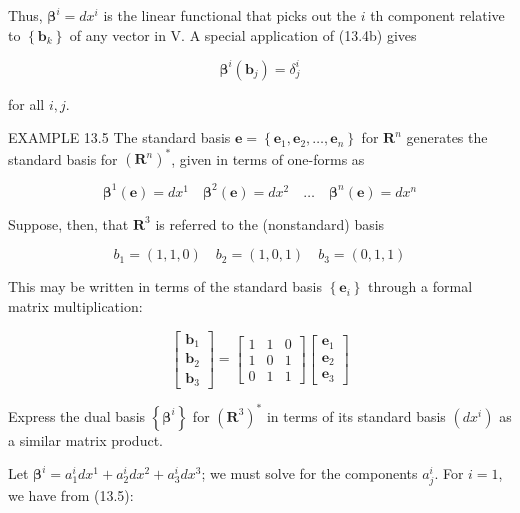 \documentclass[10pt]{article}
\begin{document}
Thus, $\boldsymbol{\beta}^{i}=d x^{i}$ is the linear functional that picks out the $i$ th component relative to $\left\{\mathbf{b}_{k}\right\}$ of any vector in V. A special application of (13.4b) gives


\begin{equation*}
\boldsymbol{\beta}^{i}\left(\mathbf{b}_{j}\right)=\delta_{j}^{i} \tag{13.5}
\end{equation*}


for all $i, j$.

EXAMPLE 13.5 The standard basis $\mathbf{e}=\left\{\mathbf{e}_{1}, \mathbf{e}_{2}, \ldots, \mathbf{e}_{n}\right\}$ for $\mathbf{R}^{n}$ generates the standard basis for $\left(\mathbf{R}^{n}\right)^{*}$, given in terms of one-forms as

$$
\boldsymbol{\beta}^{1}(\mathbf{e})=d x^{1} \quad \boldsymbol{\beta}^{2}(\mathbf{e})=d x^{2} \quad \ldots \quad \boldsymbol{\beta}^{n}(\mathbf{e})=d x^{n}
$$

Suppose, then, that $\mathbf{R}^{3}$ is referred to the (nonstandard) basis

$$
b_{1}=(1,1,0) \quad b_{2}=(1,0,1) \quad b_{3}=(0,1,1)
$$

This may be written in terms of the standard basis $\left\{\mathbf{e}_{i}\right\}$ through a formal matrix multiplication:

$$
\left[\begin{array}{l}
\mathbf{b}_{1} \\
\mathbf{b}_{2} \\
\mathbf{b}_{3}
\end{array}\right]=\left[\begin{array}{lll}
1 & 1 & 0 \\
1 & 0 & 1 \\
0 & 1 & 1
\end{array}\right]\left[\begin{array}{l}
\mathbf{e}_{1} \\
\mathbf{e}_{2} \\
\mathbf{e}_{3}
\end{array}\right]
$$

Express the dual basis $\left\{\boldsymbol{\beta}^{i}\right\}$ for $\left(\mathbf{R}^{3}\right)^{*}$ in terms of its standard basis $\left(d x^{i}\right)$ as a similar matrix product.

Let $\boldsymbol{\beta}^{i}=a_{1}^{i} d x^{1}+a_{2}^{i} d x^{2}+a_{3}^{i} d x^{3}$; we must solve for the components $a_{j}^{i}$. For $i=1$, we have from (13.5):
\end{document}
